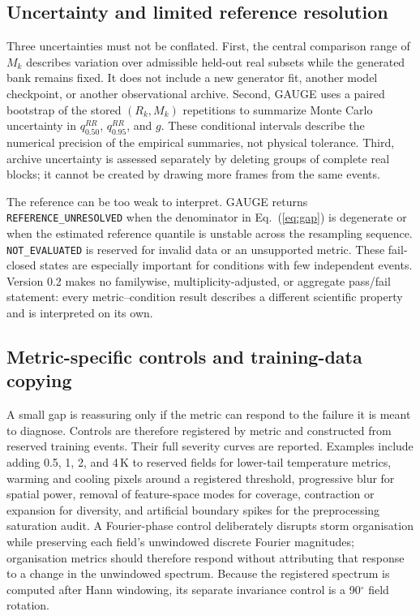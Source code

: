 \documentclass[gmd, manuscript]{copernicus}
\begin{document}
\subsection{Uncertainty and limited reference resolution}

Three uncertainties must not be conflated. First, the central comparison range of
\(M_k\) describes variation over admissible held-out real subsets while the generated
bank remains fixed. It does not include a new generator fit, another model checkpoint,
or another observational archive. Second, GAUGE uses a paired bootstrap of the stored
\((R_k,M_k)\) repetitions to summarize Monte Carlo uncertainty in
\(q_{0.50}^{RR}\), \(q_{0.95}^{RR}\), and \(g\). These conditional intervals describe
the numerical precision of the empirical summaries, not physical tolerance. Third,
archive uncertainty is assessed separately by deleting groups of complete real
blocks; it cannot be created by drawing more frames from the same events.

The reference can be too weak to interpret. GAUGE returns
\texttt{REFERENCE\_UNRESOLVED} when the denominator in Eq.~(\ref{eq:gap}) is
degenerate or when the estimated reference quantile is unstable across the
resampling sequence. \texttt{NOT\_EVALUATED} is reserved for invalid data or an
unsupported metric. These fail-closed states are especially important for conditions
with few independent events. Version 0.2 makes no familywise, multiplicity-adjusted,
or aggregate pass/fail statement: every metric--condition result describes a
different scientific property and is interpreted on its own.

\subsection{Metric-specific controls and training-data copying}

A small gap is reassuring only if the metric can respond to the failure it is meant
to diagnose. Controls are therefore registered by metric and constructed from
reserved training events. Their full severity curves are reported. Examples include
adding 0.5, 1, 2, and 4\,K to reserved fields for lower-tail temperature metrics,
warming and cooling pixels around a registered threshold, progressive blur for
spatial power, removal of feature-space modes for coverage,
contraction or expansion for diversity, and artificial boundary spikes for the
preprocessing saturation audit. A Fourier-phase control deliberately disrupts storm
organisation while preserving each field's unwindowed discrete Fourier magnitudes;
organisation metrics should therefore respond without attributing that response to a
change in the unwindowed spectrum. Because the registered spectrum is computed after
Hann windowing, its separate invariance control is a 90\(^\circ\) field rotation.
\end{document}
